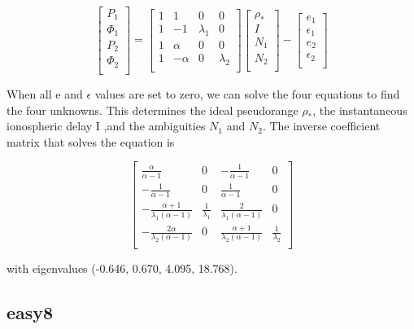 \begin{equation}
\begin{bmatrix}
P_{1}\\
\Phi_{1}\\
P_{2}\\
\Phi_{2}\\
\end{bmatrix}
=\begin{bmatrix}
1 & 1 & 0 & 0\\
1 & -1 & \lambda_{1} & 0\\
1 & \alpha & 0 & 0\\
1 & -\alpha & 0 & \lambda_{2}\\
\end{bmatrix}
\begin{bmatrix}
\rho_{*}\\
I\\
N_{1}\\
N_{2}\\
\end{bmatrix}
-
\begin{bmatrix}
e_{1}\\
\epsilon_{1}\\
e_{2}\\
\epsilon_{2}\\
\end{bmatrix}
\end{equation}

When all e and $\epsilon$ values are set to zero, we can solve the four equations to find the four unknowns. This determines the ideal pseudorange $\rho_{*}$, the instantaneous ionospheric delay I ,and the ambiguities $N_{1}$ and $N_{2}$. The inverse coefficient matrix that solves the equation is

\begin{equation}
\begin{bmatrix}
\frac{\alpha}{\alpha-1}&0&-\frac{1}{\alpha-1}&0\\
-\frac{1}{\alpha-1}&0&\frac{1}{\alpha-1}&0\\
-\frac{\alpha+1}{\lambda_{1}(\alpha-1)}&\frac{1}{\lambda_{1}}&\frac{2}{\lambda_{1}(\alpha-1)}&0\\
-\frac{2\alpha}{\lambda_{2}(\alpha-1)}&0&\frac{\alpha+1}{\lambda_{2}(\alpha-1)}&\frac{1}{\lambda_{2}}\\
\end{bmatrix}
\end{equation}

with eigenvalues (-0.646, 0.670, 4.095, 18.768).

\subsection{easy8}

